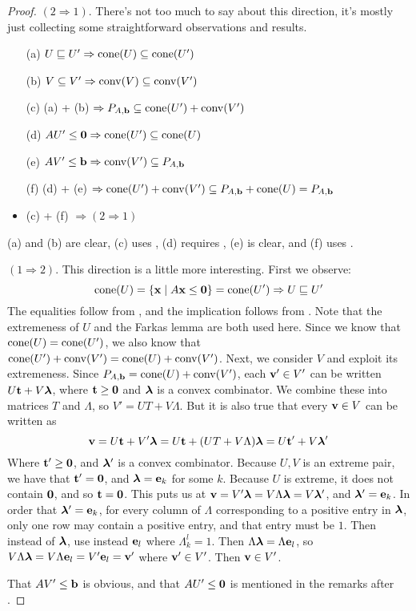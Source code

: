 \begin{proof}
	$(2 \Rightarrow 1)$.  There's not too much to say about this direction, it's mostly just collecting some straightforward observations and results.
	\begin{itemize}
		\item[(a)] $U \sqsubseteq U' \Rightarrow \operatorname{cone}(U) \subseteq \operatorname{cone}(U')$
		\item[(b)] $V \subseteq V' \Rightarrow \operatorname{conv}(V) \subseteq \operatorname{conv}(V')$
		\item[(c)] (a) + (b) $\Rightarrow P_{A,\mathbf{b}} \subseteq \operatorname{cone}(U') + \operatorname{conv}(V')$
		\item[(d)] $AU'\leq\mathbf{0} \Rightarrow \operatorname{cone}(U') \subseteq \operatorname{cone}(U)$
		\item[(e)] $AV'\leq\mathbf{b} \Rightarrow \operatorname{conv}(V') \subseteq P_{A,\mathbf{b}}$
		\item[(f)] (d) + (e) $\Rightarrow \operatorname{cone}(U') + \operatorname{conv}(V') \subseteq P_{A,\mathbf{b}} + \operatorname{cone}(U) = P_{A,\mathbf{b}}$
		\item (c) + (f) $\Rightarrow (2 \Rightarrow 1)$
	\end{itemize}
	(a) and (b) are clear, (c) uses , (d) requires , (e) is clear, and (f) uses .

	$(1 \Rightarrow 2)$.  This direction is a little more interesting.  First we observe:
	\[ \operatorname{cone}(U) = \left\{\mathbf{x}\;|\; A\mathbf{x}\leq\mathbf{0}\right\} = \operatorname{cone}(U') \Rightarrow U \sqsubseteq U' \]
	The equalities follow from , and the implication follows from .  Note that the extremeness of $U$ and the Farkas lemma are both used here.  Since we know that $\operatorname{cone}(U) = \operatorname{cone}(U')$, we also know that $\operatorname{cone}(U') + \operatorname{conv}(V') = \operatorname{cone}(U) + \operatorname{conv}(V')$.  Next, we consider $V$ and exploit its extremeness.  Since $P_{A,\mathbf{b}} = \operatorname{cone}(U) + \operatorname{conv}(V')$, each $\mathbf{v}'\in V'$ can be written $U\mathbf{t} + V\bm{\lambda}$, where $\mathbf{t} \geq \mathbf{0}$ and $\bm{\lambda}$ is a convex combinator.  We combine these into matrices $T$ and $\Lambda$, so $V' = UT + V\Lambda$.  But it is also true that every $\mathbf{v}\in V$ can be written as
	\[ \mathbf{v} = U\mathbf{t} + V'\bm{\lambda} = U\mathbf{t} + (UT + V\Lambda)\bm{\lambda} = U\mathbf{t}' + V\bm{\lambda}' \]
	Where $\mathbf{t}'\geq\mathbf{0}$, and $\bm{\lambda}'$ is a convex combinator.  Because $U,V$ is an extreme pair, we have that $\mathbf{t}'=\mathbf{0}$, and $\bm{\lambda} = \mathbf{e}_k$ for some $k$.  Because $U$ is extreme, it does not contain $\mathbf{0}$, and so $\mathbf{t} = \mathbf{0}$.  This puts us at $\mathbf{v} = V'\bm{\lambda} = V\Lambda\bm{\lambda} = V\bm{\lambda}'$, and $\bm{\lambda}' = \mathbf{e}_k$.  In order that $\bm{\lambda}' = \mathbf{e}_k$, for every column of $\Lambda$ corresponding to a positive entry in $\bm{\lambda}$, only one row may contain a positive entry, and that entry must be $1$.  Then instead of $\bm{\lambda}$, use instead $\mathbf{e}_l$ where $\Lambda_k^l = 1$.  Then $\Lambda\bm{\lambda} = \Lambda\mathbf{e}_l$, so $V\Lambda\bm{\lambda} = V\Lambda\mathbf{e}_l = V'\mathbf{e}_l=\mathbf{v}'$ where $\mathbf{v}'\in V'$.  Then $\mathbf{v} \in V'$.

	That $AV'\leq\mathbf{b}$ is obvious, and that $AU'\leq\mathbf{0}$ is mentioned in the remarks after .
\end{proof}

